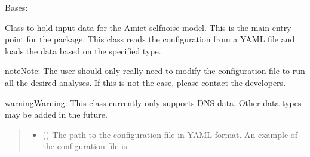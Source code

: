 \documentclass[letterpaper,10pt,english]{sphinxmanual}
\begin{document}

\begin{fulllineitems}
\label{\detokenize{io:amiet_self_noise.io_utils.InputData}}
\pysigstartsignatures
\pysiglinewithargsret
{}
{\sphinxparamcomma {}}
{}
\pysigstopsignatures
\sphinxAtStartPar
Bases: 

\sphinxAtStartPar
Class to hold input data for the Amiet self\sphinxhyphen{}noise model.
This is the main entry point for the  package. This class reads
the configuration from a YAML file and loads the data based on the specified type.

\begin{sphinxadmonition}{note}{Note:}
\sphinxAtStartPar
The user should only really need to modify the configuration file to run all the
desired analyses. If this is not the case, please contact the developers.
\end{sphinxadmonition}

\begin{sphinxadmonition}{warning}{Warning:}
\sphinxAtStartPar
This class currently only supports DNS data. Other data types may be added in
the future.
\end{sphinxadmonition}
\begin{quote}\begin{description}
\begin{itemize}
\item {} 
\sphinxAtStartPar
{} () \textendash{} 
\sphinxAtStartPar
The path to the configuration file in YAML format. An example of the
configuration file is:


\end{itemize}
\end{description}
\end{quote}
\end{fulllineitems}
\end{document}
